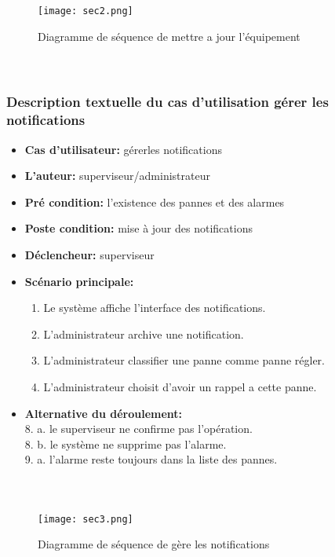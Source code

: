 \begin{figure}
\centering
  \texttt{[image: sec2.png]}\\
  \caption{Diagramme de séquence de mettre a jour l'équipement}
\end{figure}
\paragraph{\\}
\newpage 
\subsubsection{ Description textuelle du cas d'utilisation gérer les notifications}
\begin{itemize}
\item \textbf{Cas d'utilisateur: }gérerles notifications
\item \textbf{L'auteur: } superviseur/administrateur
\item \textbf{Pré condition: } l'existence des pannes et des alarmes
\item \textbf{Poste condition:} mise à jour  des notifications
\item \textbf{Déclencheur: } superviseur
\item \textbf{Scénario principale: }
\begin{enumerate}
\item Le système affiche l'interface des notifications.
\item L'administrateur  archive une notification.
\item L'administrateur  classifier une panne comme panne régler.
\item L'administrateur choisit d'avoir un rappel a cette panne.
\end{enumerate}
\item \textbf{Alternative du déroulement: \\}
8. a. le superviseur ne confirme pas l'opération.\\
8. b. le système ne supprime pas l'alarme.\\
9. a. l'alarme reste toujours dans la liste des pannes.\\
\end{itemize}
\paragraph{\\}
\newpage 
\begin{figure}
\centering
  \texttt{[image: sec3.png]}\\
  \caption{Diagramme de séquence de gère les notifications }
\end{figure}

